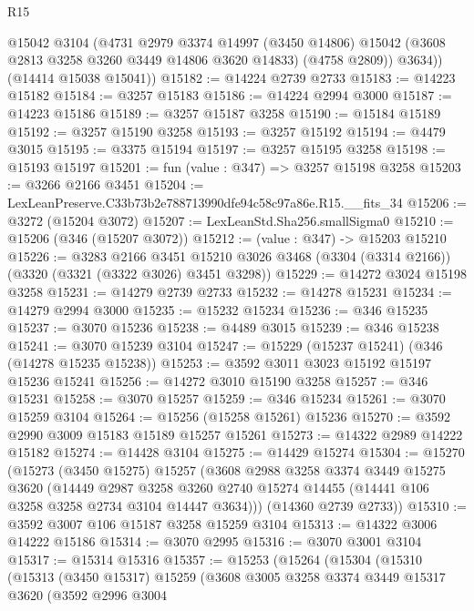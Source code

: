 \begin{lexlean}{R15}
\begin{coremodule}
          @15042
          @3104
          (@4731
            @2979
            @3374
            @14997
            (@3450 @14806)
            @15042
            (@3608 @2813 @3258 @3260 @3449 @14806 @3620 @14833)
            (@4758 @2809))
          @3634))
      (@14414 @15038 @15041))
@15182 := @14224 @2739 @2733
@15183 := @14223 @15182
@15184 := @3257 @15183
@15186 := @14224 @2994 @3000
@15187 := @14223 @15186
@15189 := @3257 @15187 @3258
@15190 := @15184 @15189
@15192 := @3257 @15190 @3258
@15193 := @3257 @15192
@15194 := @4479 @3015
@15195 := @3375 @15194
@15197 := @3257 @15195 @3258
@15198 := @15193 @15197
@15201 := fun (value : @347) => @3257 @15198 @3258
@15203 := @3266 @2166 @3451
@15204 := LexLeanPreserve.C33b73b2e788713990dfe94c58c97a86e.R15.__fits_34
@15206 := @3272 (@15204 @3072)
@15207 := LexLeanStd.Sha256.smallSigma0
@15210 := @15206 (@346 (@15207 @3072))
@15212 := (value : @347) -> @15203 @15210
@15226 := @3283
    @2166
    @3451
    @15210
    @3026
    @3468
    (@3304 (@3314 @2166))
    (@3320 (@3321 (@3322 @3026) @3451 @3298))
@15229 := @14272 @3024 @15198 @3258
@15231 := @14279 @2739 @2733
@15232 := @14278 @15231
@15234 := @14279 @2994 @3000
@15235 := @15232 @15234
@15236 := @346 @15235
@15237 := @3070 @15236
@15238 := @4489 @3015
@15239 := @346 @15238
@15241 := @3070 @15239 @3104
@15247 := @15229 (@15237 @15241) (@346 (@14278 @15235 @15238))
@15253 := @3592 @3011 @3023 @15192 @15197 @15236 @15241
@15256 := @14272 @3010 @15190 @3258
@15257 := @346 @15231
@15258 := @3070 @15257
@15259 := @346 @15234
@15261 := @3070 @15259 @3104
@15264 := @15256 (@15258 @15261) @15236
@15270 := @3592 @2990 @3009 @15183 @15189 @15257 @15261
@15273 := @14322 @2989 @14222 @15182
@15274 := @14428 @3104
@15275 := @14429 @15274
@15304 := @15270
    (@15273
      (@3450 @15275)
      @15257
      (@3608
        @2988
        @3258
        @3374
        @3449
        @15275
        @3620
        (@14449
          @2987
          @3258
          @3260
          @2740
          @15274
          @14455
          (@14441 @106 @3258 @3258 @2734 @3104 @14447 @3634)))
      (@14360 @2739 @2733))
@15310 := @3592 @3007 @106 @15187 @3258 @15259 @3104
@15313 := @14322 @3006 @14222 @15186
@15314 := @3070 @2995
@15316 := @3070 @3001 @3104
@15317 := @15314 @15316
@15357 := @15253
    (@15264
      (@15304
        (@15310
          (@15313
            (@3450 @15317)
            @15259
            (@3608
              @3005
              @3258
              @3374
              @3449
              @15317
              @3620
              (@3592
                @2996
                @3004

\end{coremodule}
\end{lexlean}
